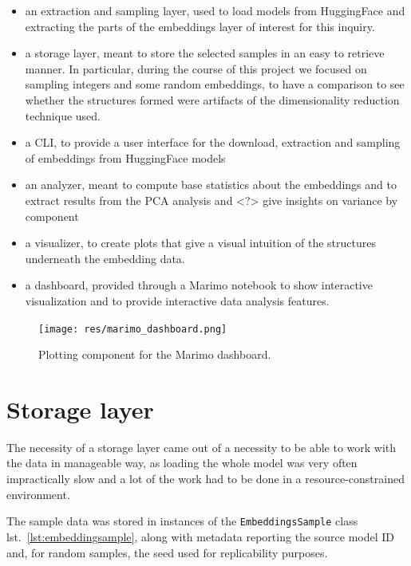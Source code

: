 \documentclass[
  a4paper, twoside, 10pt, titlepage]{book}
\begin{document}
\begin{itemize}
\item
  an extraction and sampling layer, used to load models from HuggingFace
  and extracting the parts of the embeddings layer of interest for this
  inquiry.
\item
  a storage layer, meant to store the selected samples in an easy to
  retrieve manner. In particular, during the course of this project we
  focused on sampling integers and some random embeddings, to have a
  comparison to see whether the structures formed were artifacts of the
  dimensionality reduction technique used.
\item
  a CLI, to provide a user interface for the download, extraction and
  sampling of embeddings from HuggingFace models
\item
  an analyzer, meant to compute base statistics about the embeddings and
  to extract results from the PCA analysis and \textless?\textgreater{}
  give insights on variance by component
\item
  a visualizer, to create plots that give a visual intuition of the
  structures underneath the embedding data.
\item
  a dashboard, provided through a Marimo notebook to show interactive
  visualization and to provide interactive data analysis features.
\end{itemize}

\begin{figure}
\centering
\texttt{[image: res/marimo\_dashboard.png]}
\caption{Plotting component for the Marimo dashboard.}
\end{figure}

\clearpage

\section{Storage layer}\label{storage-layer}

The necessity of a storage layer came out of a necessity to be able to
work with the data in manageable way, as loading the whole model was
very often impractically slow and a lot of the work had to be done in a
resource-constrained environment.

The sample data was stored in instances of the \texttt{EmbeddingsSample}
class lst.~\ref{lst:embeddingsample}, along with metadata reporting the
source model ID and, for random samples, the seed used for replicability
purposes.
\end{document}
